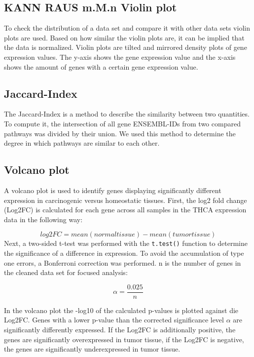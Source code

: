 \documentclass[
  parskip,
  oneside]{scrreprt}
\begin{document}
\hypertarget{kann-raus-m.m.n-violin-plot}{%
\subsection{KANN RAUS m.M.n Violin
plot}\label{kann-raus-m.m.n-violin-plot}}

To check the distribution of a data set and compare it with other data
sets violin plots are used. Based on how similar the violin plots are,
it can be implied that the data is normalized. Violin plots are tilted
and mirrored density plots of gene expression values. The y-axis shows
the gene expression value and the x-axis shows the amount of genes with
a certain gene expression value.

\hypertarget{jaccard-index-1}{%
\subsection{Jaccard-Index}\label{jaccard-index-1}}

The Jaccard-Index is a method to describe the similarity between two
quantities. To compute it, the intersection of all gene ENSEMBL-IDs from
two compared pathways was divided by their union. We used this method to
determine the degree in which pathways are similar to each other.

\hypertarget{volcano-plot}{%
\subsection{Volcano plot}\label{volcano-plot}}

A volcano plot is used to identify genes displaying significantly
different expression in carcinogenic versus homeostatic tissues. First,
the log2 fold change (Log2FC) is calculated for each gene across all
samples in the THCA expression data in the following way:

\[
log2FC = mean(normal tissue) - mean(tumor tissue)
\]Next, a two-sided t-test was performed with the \texttt{t.test()}
function to determine the significance of a difference in expression. To
avoid the accumulation of type one errors, a Bonferroni correction was
performed. n is the number of genes in the cleaned data set for focused
analysis:

\[
\alpha = \frac{0.025}{n}
\]

In the volcano plot the -log10 of the calculated p-values is plotted
against die Log2FC. Genes with a lower p-value than the corrected
significance level \(\alpha\) are significantly differently expressed.
If the Log2FC is additionally positive, the genes are significantly
overexpressed in tumor tissue, if the Log2FC is negative, the genes are
significantly underexpressed in tumor tissue.
\end{document}
